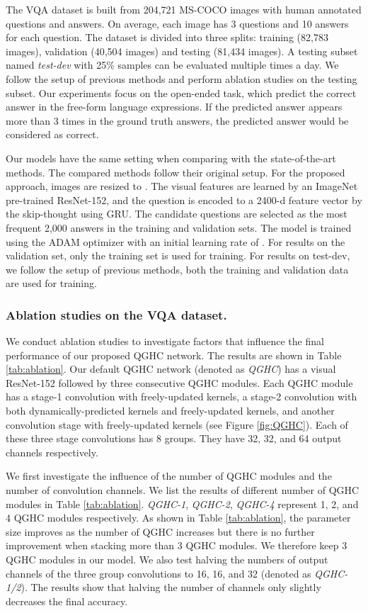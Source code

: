 \documentclass[runningheads]{llncs}
\begin{document}
The VQA dataset is built from 204,721 MS-COCO images with human annotated questions and answers. On average, each image has 3 questions and 10 answers for each question. The dataset is divided into three splits: training (82,783 images), validation (40,504 images) and testing (81,434 images).
A testing subset named \emph{test-dev} with 25\% samples can be evaluated multiple times a day. We follow the setup of previous methods and perform ablation studies on the testing subset.
Our experiments focus on the open-ended task, which predict the correct answer in the free-form language expressions.
If the predicted answer appears more than 3 times in the ground truth answers, the predicted answer would be considered as correct. 

Our models have the same setting when comparing with the state-of-the-art methods. The compared methods follow their original setup. For the proposed approach, images are resized to . The  visual features are learned by an ImageNet pre-trained ResNet-152, and the question is encoded to a 2400-d feature vector by the skip-thought \cite{kiros2015skip} using GRU. The candidate questions are selected as the most frequent 2,000 answers in the training and validation sets. The model is trained using the ADAM optimizer with an initial learning rate of . For results on the validation set, only the training set is used for training. For results on test-dev, we follow the setup of previous methods, both the training and validation data are used for training.

\subsubsection{Ablation studies on the VQA dataset.}
\label{sssec:ablation_vqa}
We conduct ablation studies to investigate factors that influence the final performance of our proposed QGHC network. The results are shown in Table \ref{tab:ablation}.
Our default QGHC network (denoted as \emph{QGHC}) has a visual ResNet-152 followed by three consecutive QGHC modules. Each QGHC module has a  stage-1 convolution with freely-updated kernels, a  stage-2 convolution with both dynamically-predicted kernels and freely-updated kernels, and another  convolution stage with freely-updated kernels (see Figure \ref{fig:QGHC}). Each of these three stage convolutions has 8 groups. They have 32, 32, and 64 output channels respectively.

We first investigate the influence of the number of QGHC modules and the number of convolution channels. We list the results of different number of QGHC modules in Table \ref{tab:ablation}. \textit{QGHC-1}, \textit{QGHC-2}, \textit{QGHC-4} represent 1, 2, and 4 QGHC modules respectively. As shown in Table \ref{tab:ablation}, the parameter size improves as the number of QGHC increases but there is no further improvement when stacking more than 3 QGHC modules. We therefore keep 3 QGHC modules in our model.
We also test halving the numbers of output channels of the three group convolutions to 16, 16, and 32 (denoted as \emph{QGHC-1/2}). The results show that halving the number of channels only slightly decreases the final accuracy.
\end{document}
